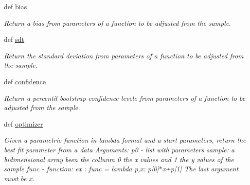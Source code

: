 \begin{DoxyCompactItemize}
def \hyperlink{classpybootstrap_1_1pybootstrap_1_1bootstrap_ab50eafcd1cb399ab01f87bc82313c5db}{bias}
\begin{DoxyCompactList}\small\item\em Return a bias from parameters of a function to be adjusted from the sample. \end{DoxyCompactList}\item 
def \hyperlink{classpybootstrap_1_1pybootstrap_1_1bootstrap_aa9a328c614c381eb8dcb21af7199d210}{sdt}
\begin{DoxyCompactList}\small\item\em Return the standard deviation from parameters of a function to be adjusted from the sample. \end{DoxyCompactList}\item 
def \hyperlink{classpybootstrap_1_1pybootstrap_1_1bootstrap_acee0fb6d693c5351774c73d8f6f08c12}{confidence}
\begin{DoxyCompactList}\small\item\em Return a percentil bootstrap confidence levele from parameters of a function to be adjusted from the sample. \end{DoxyCompactList}\item 
def \hyperlink{classpybootstrap_1_1pybootstrap_1_1bootstrap_a0d0d2fbef684ae6f7b6d29c6846d0847}{optimizer}
\begin{DoxyCompactList}\small\item\em Given a parametric function in lambda format and a start parameters, return the best fit parameter from a data Arguments\-: p0 -\/ list with parameters sample\-: a bidimensional array been the collunm 0 the x values and 1 the y values of the sample func -\/ function\-: ex \-: func = lambda p,x\-: p\mbox{[}0\mbox{]}$\ast$x+p\mbox{[}1\mbox{]} The last argument must be x. \end{DoxyCompactList}\end{DoxyCompactItemize}
